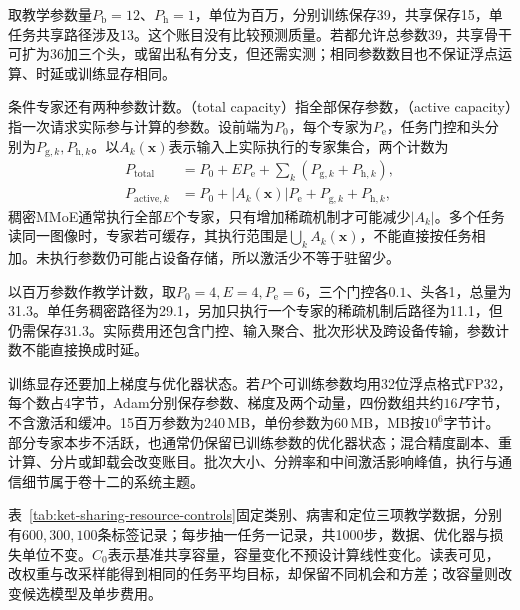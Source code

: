 取教学参数量$P_{\mathrm b}=12$、$P_{\mathrm h}=1$，单位为百万，分别训练保存39，共享保存15，单任务共享路径涉及13。这个账目没有比较预测质量。若都允许总参数39，共享骨干可扩为36加三个头，或留出私有分支，但还需实测；相同参数数目也不保证浮点运算、时延或训练显存相同。

条件专家还有两种参数计数。（total capacity）指全部保存参数，（active capacity）指一次请求实际参与计算的参数。设前端为$P_0$，每个专家为$P_{\mathrm e}$，任务门控和头分别为$P_{\mathrm g,k},P_{\mathrm h,k}$。以$A_k(\bm x)$表示输入上实际执行的专家集合，两个计数为
\begin{align}
  P_{\mathrm{total}}
    &=P_0+EP_{\mathrm e}
      +\sum_k(P_{\mathrm g,k}+P_{\mathrm h,k}),
  \nonumber\\
  P_{\mathrm{active},k}
    &=P_0+|A_k(\bm x)|P_{\mathrm e}
      +P_{\mathrm g,k}+P_{\mathrm h,k},
  \label{eq:ket-sharing-expert-budget}
\end{align}
稠密MMoE通常执行全部$E$个专家，只有增加稀疏机制才可能减少$|A_k|$。多个任务读同一图像时，专家若可缓存，其执行范围是$\bigcup_kA_k(\bm x)$，不能直接按任务相加。未执行参数仍可能占设备存储，所以激活少不等于驻留少。

以百万参数作教学计数，取$P_0=4,E=4,P_{\mathrm e}=6$，三个门控各$0.1$、头各1，总量为31.3。单任务稠密路径为29.1，另加只执行一个专家的稀疏机制后路径为11.1，但仍需保存31.3。实际费用还包含门控、输入聚合、批次形状及跨设备传输，参数计数不能直接换成时延。

训练显存还要加上梯度与优化器状态。若$P$个可训练参数均用32位浮点格式FP32，每个数占4字节，Adam分别保存参数、梯度及两个动量，四份数组共约$16P$字节，不含激活和缓冲。15百万参数为240\,MB，单份参数为60\,MB，MB按$10^6$字节计。部分专家本步不活跃，也通常仍保留已训练参数的优化器状态；混合精度副本、重计算、分片或卸载会改变账目。批次大小、分辨率和中间激活影响峰值，执行与通信细节属于卷十二的系统主题。

表~\ref{tab:ket-sharing-resource-controls}固定类别、病害和定位三项教学数据，分别有$600,300,100$条标签记录；每步抽一任务一记录，共1000步，数据、优化器与损失单位不变。$C_0$表示基准共享容量，容量变化不预设计算线性变化。读表可见，改权重与改采样能得到相同的任务平均目标，却保留不同机会和方差；改容量则改变候选模型及单步费用。

